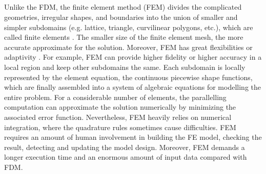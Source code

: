 \subsection{}


Unlike the FDM, the finite element method (FEM)
\cite{zlamal1968finite} divides the complicated geometries, irregular
shapes, and boundaries into the union of smaller and simpler
subdomains (e.g. lattice, triangle, curvilinear polygons, etc.), which
are called finite elements \cite{logan2011first}. The smaller size of
the finite element mesh, the more accurate approximate for the
solution. Moreover, FEM has great flexibilities or adaptivity
\cite{reddy1993introduction}. For example, FEM can provide higher
fidelity or higher accuracy in a local region and keep other
subdomains the same. Each subdomain is locally represented by the
element equation, the continuous piecewise shape functions, which are
finally assembled into a system of algebraic equations for modelling
the entire problem. For a considerable number of elements, the
parallelling computation can approximate the solution numerically by
minimizing the associated error function. Nevertheless, FEM heavily
relies on numerical integration, where the quadrature rules sometimes
cause difficulties. FEM requires an amount of human involvement in
building the FE model, checking the result, detecting and updating the
model design. Moreover, FEM demands a longer execution time and an
enormous amount of input data compared with FDM.

